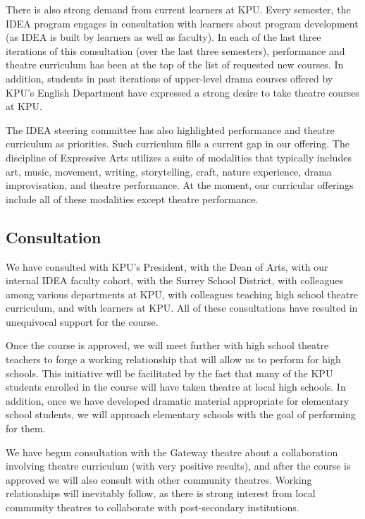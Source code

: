 \documentclass[letterpaper,10pt,headsepline]{scrreprt}
\begin{document}
There is also strong demand from current learners at KPU. Every
semester, the IDEA program engages in consultation with learners about
program development (as IDEA is built by learners as well as faculty).
In each of the last three iterations of this consultation (over the last
three semesters), performance and theatre curriculum has been at the top
of the list of requested new courses. In addition, students in past
iterations of upper-level drama courses offered by KPU's English
Department have expressed a strong desire to take theatre courses at
KPU.

The IDEA steering committee has also highlighted performance and theatre
curriculum as priorities. Such curriculum fills a current gap in our
offering. The discipline of Expressive Arts utilizes a suite of
modalities that typically includes art, music, movement, writing,
storytelling, craft, nature experience, drama improvisation, and theatre
performance. At the moment, our curricular offerings include all of
these modalities except theatre performance.

\subsection{Consultation}

We have consulted with KPU's President, with the Dean of Arts, with our
internal IDEA faculty cohort, with the Surrey School District, with
colleagues among various departments at KPU, with colleagues teaching
high school theatre curriculum, and with learners at KPU. All of these
consultations have resulted in unequivocal support for the course.

Once the course is approved, we will meet further with high school
theatre teachers to forge a working relationship that will allow us to
perform for high schools. This initiative will be facilitated by the
fact that many of the KPU students enrolled in the course will have
taken theatre at local high schools. In addition, once we have developed
dramatic material appropriate for elementary school students, we will
approach elementary schools with the goal of performing for them.

We have begun consultation with the Gateway theatre about a
collaboration involving theatre curriculum (with very positive results),
and after the course is approved we will also consult with other
community theatres. Working relationships will inevitably follow, as
there is strong interest from local community theatres to collaborate
with post-secondary institutions.
\end{document}
